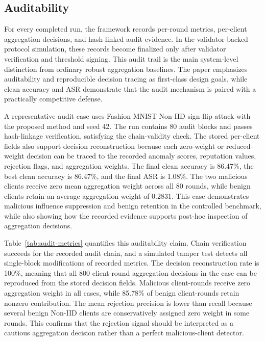 \documentclass[preprint,authoryear,12pt]{elsarticle}
\begin{document}
\subsection{Auditability}

For every completed run, the framework records per-round metrics, per-client aggregation decisions, and hash-linked audit evidence. In the validator-backed protocol simulation, these records become finalized only after validator verification and threshold signing. This audit trail is the main system-level distinction from ordinary robust aggregation baselines. The paper emphasizes auditability and reproducible decision tracing as first-class design goals, while clean accuracy and ASR demonstrate that the audit mechanism is paired with a practically competitive defense.

A representative audit case uses Fashion-MNIST Non-IID sign-flip attack with the proposed method and seed 42. The run contains 80 audit blocks and passes hash-linkage verification, satisfying the chain-validity check. The stored per-client fields also support decision reconstruction because each zero-weight or reduced-weight decision can be traced to the recorded anomaly scores, reputation values, rejection flags, and aggregation weights. The final clean accuracy is 86.47\%, the best clean accuracy is 86.47\%, and the final ASR is 1.08\%. The two malicious clients receive zero mean aggregation weight across all 80 rounds, while benign clients retain an average aggregation weight of 0.2831. This case demonstrates malicious influence suppression and benign retention in the controlled benchmark, while also showing how the recorded evidence supports post-hoc inspection of aggregation decisions.

Table~\ref{tab:audit-metrics} quantifies this auditability claim. Chain verification succeeds for the recorded audit chain, and a simulated tamper test detects all single-block modifications of recorded metrics. The decision reconstruction rate is 100\%, meaning that all 800 client-round aggregation decisions in the case can be reproduced from the stored decision fields. Malicious client-rounds receive zero aggregation weight in all cases, while 85.78\% of benign client-rounds retain nonzero contribution. The mean rejection precision is lower than recall because several benign Non-IID clients are conservatively assigned zero weight in some rounds. This confirms that the rejection signal should be interpreted as a cautious aggregation decision rather than a perfect malicious-client detector.
\end{document}
